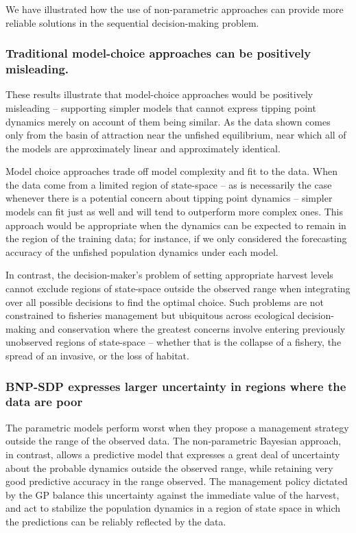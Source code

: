 \documentclass[author-year, review]{elsarticle} %
\begin{document}
We have illustrated how the use of non-parametric approaches can provide
more reliable solutions in the sequential decision-making problem.

\subsubsection{Traditional model-choice approaches can be positively
misleading.}\label{traditional-model-choice-approaches-can-be-positively-misleading.}

These results illustrate that model-choice approaches would be
positively misleading -- supporting simpler models that cannot express
tipping point dynamics merely on account of them being similar. As the
data shown comes only from the basin of attraction near the unfished
equilibrium, near which all of the models are approximately linear and
approximately identical.

Model choice approaches trade off model complexity and fit to the data.
When the data come from a limited region of state-space -- as is
necessarily the case whenever there is a potential concern about tipping
point dynamics -- simpler models can fit just as well and will tend to
outperform more complex ones. This approach would be appropriate when
the dynamics can be expected to remain in the region of the training
data; for instance, if we only considered the forecasting accuracy of
the unfished population dynamics under each model.

In contrast, the decision-maker's problem of setting appropriate harvest
levels cannot exclude regions of state-space outside the observed range
when integrating over all possible decisions to find the optimal choice.
Such problems are not constrained to fisheries management but ubiquitous
across ecological decision-making and conservation where the greatest
concerns involve entering previously unobserved regions of state-space
-- whether that is the collapse of a fishery, the spread of an invasive,
or the loss of habitat.

\subsubsection{BNP-SDP expresses larger uncertainty in regions where the
data are
poor}\label{bnp-sdp-expresses-larger-uncertainty-in-regions-where-the-data-are-poor}

The parametric models perform worst when they propose a management
strategy outside the range of the observed data. The non-parametric
Bayesian approach, in contrast, allows a predictive model that expresses
a great deal of uncertainty about the probable dynamics outside the
observed range, while retaining very good predictive accuracy in the
range observed. The management policy dictated by the GP balance this
uncertainty against the immediate value of the harvest, and act to
stabilize the population dynamics in a region of state space in which
the predictions can be reliably reflected by the data.
\end{document}
